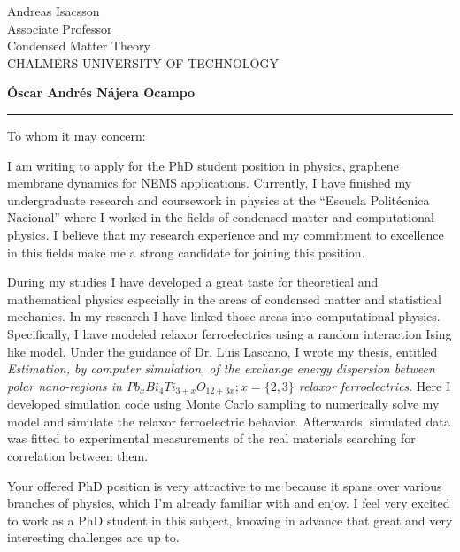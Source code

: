 \documentclass{letter}
\begin{document}
\signature{\vspace{-1.5cm}Óscar Nájera}           %
\address{Cap.Rafael Ramos E2-254 Casa \#2 \\
Quito,Ecuador\\
(+593-9) 643-9206\\
najera.oscar@gmail.com} 


\begin{letter}{Andreas Isacsson\\
Associate Professor\\
Condensed Matter Theory\\
CHALMERS UNIVERSITY OF TECHNOLOGY}

\begin{flushleft}
{\large\bf Óscar Andrés Nájera Ocampo}
\end{flushleft}
\hrule height 1pt


\opening{To whom it may concern:}
\onehalfspacing

I am writing to apply for the PhD student position in physics, graphene
membrane dynamics for NEMS applications.
Currently, I have finished my undergraduate research and coursework in
physics at the ``Escuela Politécnica Nacional'' where I worked in the
fields of condensed matter and computational physics. I believe
that my research experience and my commitment to excellence in
this fields make me a strong candidate for joining this position.

During my studies I have developed a great taste for theoretical and
mathematical physics especially in the areas of condensed matter
and statistical mechanics. In my research I have linked those areas into
computational physics. Specifically, I have modeled relaxor
ferroelectrics using a random interaction Ising like model. Under
the guidance of Dr. Luis Lascano, I wrote my thesis, entitled
\textit{Estimation, by computer simulation, of the exchange energy
dispersion between polar nano-regions in
$Pb_xBi_4Ti_{3+x}O_{12+3x}; x=\{2,3\}$ relaxor ferroelectrics}.
Here I developed simulation code using Monte Carlo sampling to numerically
solve my model and simulate the relaxor ferroelectric behavior.
Afterwards, simulated data was fitted to experimental measurements
of the real materials searching for correlation between them.

Your offered PhD position is very attractive to me because it spans
over various branches of physics, which I'm already familiar with and enjoy.
I feel very excited to work as a PhD student in this subject, knowing
in advance that great and very interesting challenges are up to.


\end{letter}
\end{document}
